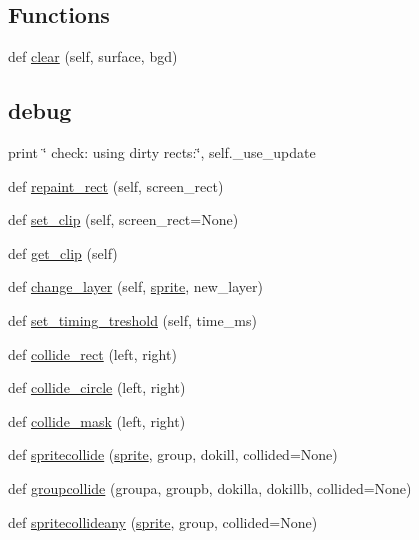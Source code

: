 \subsection*{Functions}
\begin{DoxyCompactItemize}
\item 
def \hyperlink{namespacepygame_1_1sprite_ac3dd48705499b86a7214761b75380981}{clear} (self, surface, bgd)
\begin{DoxyCompactList}\small\item\em \subsection*{debug}

print \char`\"{}               check\+: using dirty rects\+:\char`\"{}, self.\+\_\+use\+\_\+update \end{DoxyCompactList}\item 
def \hyperlink{namespacepygame_1_1sprite_af63faa0befe41ad5ed3c2c970a735275}{repaint\+\_\+rect} (self, screen\+\_\+rect)
\item 
def \hyperlink{namespacepygame_1_1sprite_a2724cd881e8ebb2a5f1f01e9d641a7f2}{set\+\_\+clip} (self, screen\+\_\+rect=None)
\item 
def \hyperlink{namespacepygame_1_1sprite_a60842ea8d65ad8db56c52b1f6f90de29}{get\+\_\+clip} (self)
\item 
def \hyperlink{namespacepygame_1_1sprite_a382eb838f5cdf51df1202a0f3350f8fc}{change\+\_\+layer} (self, \hyperlink{namespacepygame_aa4b7d2ae8175850dd21d2b548f184cb8}{sprite}, new\+\_\+layer)
\item 
def \hyperlink{namespacepygame_1_1sprite_a900a993afbcd946ffcd9af8f54154b8f}{set\+\_\+timing\+\_\+treshold} (self, time\+\_\+ms)
\item 
def \hyperlink{namespacepygame_1_1sprite_a38539bf4d7efe1157a864e4ecb9b5237}{collide\+\_\+rect} (left, right)
\item 
def \hyperlink{namespacepygame_1_1sprite_a69e8ebb1118757911e5fc2931aebf494}{collide\+\_\+circle} (left, right)
\item 
def \hyperlink{namespacepygame_1_1sprite_ac070f5d4ef6163636321a2a0ba458dcb}{collide\+\_\+mask} (left, right)
\item 
def \hyperlink{namespacepygame_1_1sprite_aa68d7d247355b00f22e3dc6b84b92dfb}{spritecollide} (\hyperlink{namespacepygame_aa4b7d2ae8175850dd21d2b548f184cb8}{sprite}, group, dokill, collided=None)
\item 
def \hyperlink{namespacepygame_1_1sprite_aa6cf4fd668b1d579f5d1385739e52851}{groupcollide} (groupa, groupb, dokilla, dokillb, collided=None)
\item 
def \hyperlink{namespacepygame_1_1sprite_a25941b8c21cff8ba445e32266ba1282d}{spritecollideany} (\hyperlink{namespacepygame_aa4b7d2ae8175850dd21d2b548f184cb8}{sprite}, group, collided=None)
\end{DoxyCompactItemize}
